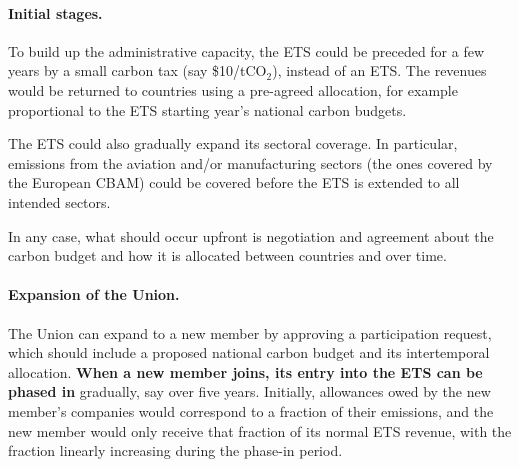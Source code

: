 \documentclass[12pt,english]{article}
\begin{document}

\paragraph{Initial stages.}

To build up the administrative capacity, the ETS could be preceded for a few years by a small carbon tax (say \$10/tCO$_\text{2}$), instead of an ETS. The revenues would be returned to countries using a pre-agreed allocation, for example proportional to the ETS starting year's national carbon budgets.

The ETS could also gradually expand its sectoral coverage. In particular, emissions from the aviation and/or manufacturing sectors (the ones covered by the European CBAM) could be covered before the ETS is extended to all intended sectors.

In any case, what should occur upfront is negotiation and agreement about the
carbon budget and how it is allocated between countries and over time.

\paragraph{Expansion of the Union.}
The Union can expand to a new member by approving a participation request, which should include a proposed national carbon budget and its intertemporal allocation. \textbf{When a new member joins, its entry into the ETS can be phased in} gradually, say over five years. Initially, allowances owed by the new member's companies would correspond to a fraction of their emissions, and the new member would only receive that fraction of its normal ETS revenue, with the fraction linearly increasing during the phase-in period. 
\end{document}
